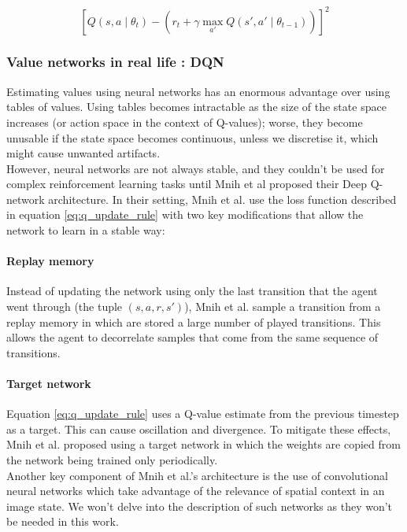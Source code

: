 \begin{equation}
	\label{eq:q_update_rule}
\left[Q(s, a\mid \theta_t) - 
	\left( r_t + \gamma \max\limits_{a'} Q(s', a'\mid \theta_{t-1}) \right) \right]^2
\end{equation}

\subsubsection{Value networks in real life : DQN}
Estimating values using neural networks has an enormous advantage over using
tables of values. Using tables becomes intractable as the size of the state
space increases (or action space in the context of Q-values); worse, they become
unusable if the state space becomes continuous, unless we discretise it,
which might cause unwanted artifacts.\\

However, neural networks are not always stable, and they couldn't be used
for complex reinforcement learning tasks until Mnih et al \cite{dqn, dqn_nature}
proposed their Deep Q-network architecture. In their setting, Mnih et al. 
use the loss function described in equation \ref{eq:q_update_rule} with two
key modifications that allow the network to learn in a stable way:

\paragraph{Replay memory} Instead of updating the network using only the 
last transition that the agent went through (the tuple $(s, a, r, s')$), 
Mnih et al. sample a transition from a replay memory in which are stored
a large number of played transitions. This allows the agent to decorrelate
samples that come from the same sequence of transitions.

\paragraph{Target network} Equation \ref{eq:q_update_rule} uses a Q-value
estimate from the previous timestep as a target. This can cause oscillation
and divergence. To mitigate these effects, Mnih et al. proposed using a target
network in which the weights are copied from the network being trained 
only periodically.\\

Another key component of Mnih et al.'s architecture is the use of
convolutional neural networks \cite{convnets} which take advantage of the
relevance of spatial context in an image state. We won't delve into the
description of such networks as they won't be needed in this work.

